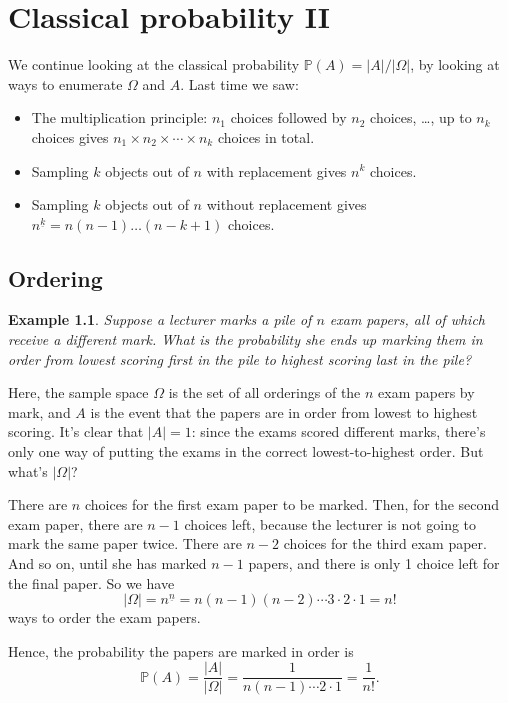 \documentclass[
  a4paper,
]{book}
\providecommand{\tightlist}{%
  \setlength{\itemsep}{0pt}\setlength{\parskip}{0pt}}
\theoremstyle{definition}
\theoremstyle{definition}
\newtheorem{example}{Example}[chapter]
\theoremstyle{definition}
\theoremstyle{definition}
\theoremstyle{remark}
\begin{document}
\hypertarget{L06-classical-ii}{%
\chapter{Classical probability II}\label{L06-classical-ii}}

We continue looking at the classical probability \(\mathbb P(A) = |A|/|\Omega|\), by looking at ways to enumerate \(\Omega\) and \(A\). Last time we saw:

\begin{itemize}
\tightlist
\item
  The multiplication principle: \(n_1\) choices followed by \(n_2\) choices, \ldots, up to \(n_k\) choices gives \(n_1 \times n_2 \times \cdots \times n_k\) choices in total.
\item
  Sampling \(k\) objects out of \(n\) with replacement gives \(n^k\) choices.
\item
  Sampling \(k\) objects out of \(n\) without replacement gives \(n^{\underline{k}} = n(n-1)\dots(n-k+1)\) choices.
\end{itemize}

\hypertarget{ordering}{%
\section{Ordering}\label{ordering}}

\begin{example}
\emph{Suppose a lecturer marks a pile of \(n\) exam papers, all of which receive a different mark. What is the probability she ends up marking them in order from lowest scoring first in the pile to highest scoring last in the pile?}

Here, the sample space \(\Omega\) is the set of all orderings of the \(n\) exam papers by mark, and \(A\) is the event that the papers are in order from lowest to highest scoring. It's clear that \(|A| = 1\): since the exams scored different marks, there's only one way of putting the exams in the correct lowest-to-highest order. But what's \(|\Omega|\)?

There are \(n\) choices for the first exam paper to be marked. Then, for the second exam paper, there are \(n - 1\) choices left, because the lecturer is not going to mark the same paper twice. There are \(n-2\) choices for the third exam paper. And so on, until she has marked \(n-1\) papers, and there is only 1 choice left for the final paper. So we have
\[ |\Omega| = {n}^{\underline{n}} = n(n-1)(n-2)\cdots3\cdot2\cdot1 = n! \]
ways to order the exam papers.

Hence, the probability the papers are marked in order is
\[ \mathbb P(A) = \frac{|A|}{|\Omega|} = \frac{1}{n(n-1)\cdots2\cdot1} = \frac{1}{n!} . \]
\end{example}
\end{document}
